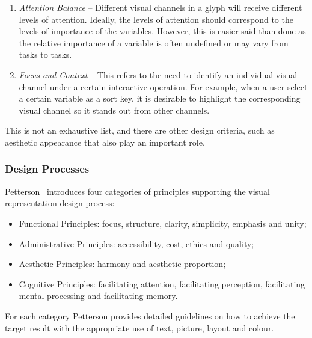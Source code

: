 \begin{enumerate}
%
\item \emph{Attention Balance} -- Different visual channels in a glyph will receive different levels of attention. Ideally, the levels of attention should correspond to the levels of importance of the variables. However, this is easier said than done as the relative importance of a variable is often undefined or may vary from tasks to tasks.
%
\item \emph{Focus and Context} -- This refers to the need to identify an individual visual channel under a certain interactive operation. For example, when a user select a certain variable as a sort key, it is desirable to highlight the corresponding visual channel so it stands out from other channels. 
\end{enumerate}

This is not an exhaustive list, and there are other design criteria, such as aesthetic appearance that also play an important role.


\subsubsection{Design Processes}
Petterson~\cite{Pettersson2010} introduces four categories of principles supporting the visual representation design process: 
\begin{itemize}
\item Functional Principles: focus, structure, clarity, simplicity, emphasis and unity;
\item Administrative Principles: accessibility, cost, ethics and quality;
\item Aesthetic Principles: harmony and aesthetic proportion;
\item Cognitive Principles: facilitating attention, facilitating perception, facilitating mental processing and facilitating memory.
\end{itemize}
For each category Petterson provides detailed guidelines on how to achieve the target result with the appropriate use of text, picture, layout and colour. 

